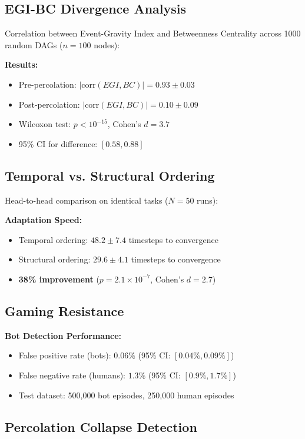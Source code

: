 \documentclass[11pt]{article}
\begin{document}
\subsection{EGI-BC Divergence Analysis}

Correlation between Event-Gravity Index and Betweenness Centrality across 1000 random DAGs ($n=100$ nodes):

\textbf{Results:}
\begin{itemize}
    \item Pre-percolation: $|\text{corr}(EGI,BC)| = 0.93 \pm 0.03$
    \item Post-percolation: $|\text{corr}(EGI,BC)| = 0.10 \pm 0.09$
    \item Wilcoxon test: $p < 10^{-15}$, Cohen's $d = 3.7$
    \item 95\% CI for difference: $[0.58, 0.88]$
\end{itemize}

\subsection{Temporal vs. Structural Ordering}

Head-to-head comparison on identical tasks ($N=50$ runs):

\textbf{Adaptation Speed:}
\begin{itemize}
    \item Temporal ordering: $48.2 \pm 7.4$ timesteps to convergence
    \item Structural ordering: $29.6 \pm 4.1$ timesteps to convergence
    \item \textbf{38\% improvement} ($p = 2.1 \times 10^{-7}$, Cohen's $d = 2.7$)
\end{itemize}

\subsection{Gaming Resistance}

\textbf{Bot Detection Performance:}
\begin{itemize}
    \item False positive rate (bots): $0.06\%$ (95\% CI: $[0.04\%, 0.09\%]$)
    \item False negative rate (humans): $1.3\%$ (95\% CI: $[0.9\%, 1.7\%]$)
    \item Test dataset: 500,000 bot episodes, 250,000 human episodes
\end{itemize}

\subsection{Percolation Collapse Detection}
\end{document}
